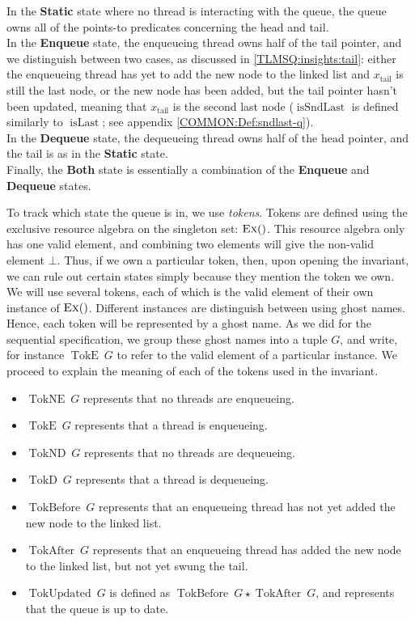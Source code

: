 \documentclass[a4paper, 10pt]{report}
\theoremstyle{definition}
\newcommand{\isLast}{\operatorname{isLast}}
\newcommand{\isSndLast}{\operatorname{isSndLast}}
\newcommand{\node}{x}
\newcommand{\nodeN}[1]{\node_{\mathrm{#1}}}
\newcommand{\nodetail}{\nodeN{tail}}
\newcommand{\StaticState}{\textbf{Static}\xspace}
\newcommand{\EnqueueState}{\textbf{Enqueue}\xspace}
\newcommand{\DequeueState}{\textbf{Dequeue}\xspace}
\newcommand{\BothState}{\textbf{Both}\xspace}
\newcommand{\Qg}{G}
\newcommand{\TokE}[1]{\operatorname{TokE} ~ #1}
\newcommand{\TokEQg}{\TokE{\Qg}}
\newcommand{\TokNE}[1]{\operatorname{TokNE} ~ #1}
\newcommand{\TokNEQg}{\TokNE{\Qg}}
\newcommand{\TokD}[1]{\operatorname{TokD} ~ #1}
\newcommand{\TokDQg}{\TokD{\Qg}}
\newcommand{\TokND}[1]{\operatorname{TokND} ~ #1}
\newcommand{\TokNDQg}{\TokND{\Qg}}
\newcommand{\TokBefore}[1]{\operatorname{TokBefore} ~ #1}
\newcommand{\TokBeforeQg}{\TokBefore{\Qg}}
\newcommand{\TokAfter}[1]{\operatorname{TokAfter} ~ #1}
\newcommand{\TokAfterQg}{\TokAfter{\Qg}}
\newcommand{\TokUpdated}[1]{\operatorname{TokUpdated} ~ #1}
\newcommand{\TokUpdatedQg}{\TokUpdated{\Qg}}
\begin{document}
In the \StaticState state where no thread is interacting with the queue, the queue owns all of the points-to predicates concerning the head and tail.\\
In the \EnqueueState state, the enqueueing thread owns half of the tail pointer, and we distinguish between two cases, as discussed in \ref{TLMSQ:insights:tail}: either the enqueueing thread has yet to add the new node to the linked list and $\nodetail$ is still the last node, or the new node has been added, but the tail pointer hasn't been updated, meaning that $\nodetail$ is the second last node ($\isSndLast$ is defined similarly to $\isLast$; see appendix \ref{COMMON:Def:sndlast-q}).\\
In the \DequeueState state, the dequeueing thread owns half of the head pointer, and the tail is as in the \StaticState state.\\
Finally, the \BothState state is essentially a combination of the \EnqueueState and \DequeueState states.

To track which state the queue is in, we use \textit{tokens}. Tokens are defined using the exclusive resource algebra on the singleton set: $\textsc{Ex}{()}$. This resource algebra only has one valid element, and combining two elements will give the non-valid element $\bot$. Thus, if we own a particular token, then, upon opening the invariant, we can rule out certain states simply because they mention the token we own.\\
We will use several tokens, each of which is the valid element of their own instance of $\textsc{Ex}{()}$. Different instances are distinguish between using ghost names. Hence, each token will be represented by a ghost name. As we did for the sequential specification, we group these ghost names into a tuple $\Qg$, and write, for instance $\TokEQg$ to refer to the valid element of a particular instance. We proceed to explain the meaning of each of the tokens used in the invariant.
\begin{itemize}
  \item $\TokNEQg$ represents that no threads are enqueueing.
  \item $\TokEQg$ represents that a thread is enqueueing.
  \item $\TokNDQg$ represents that no threads are dequeueing.
  \item $\TokDQg$ represents that a thread is dequeueing.
  \item $\TokBeforeQg$ represents that an enqueueing thread has not yet added the new node to the linked list.
  \item $\TokAfterQg$ represents that an enqueueing thread has added the new node to the linked list, but not yet swung the tail.
  \item $\TokUpdatedQg$ is defined as $\TokBeforeQg \star{} \TokAfterQg$, and represents that the queue is up to date.
\end{itemize}
\end{document}
